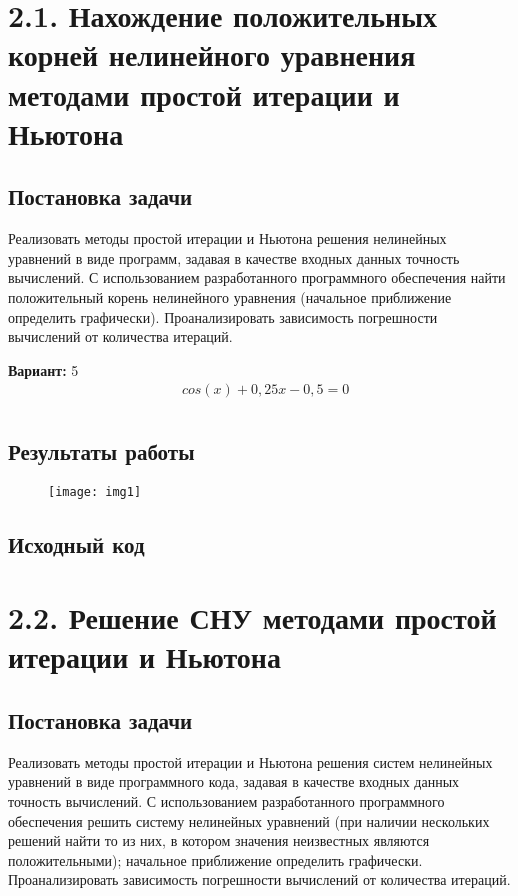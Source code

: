 \section* {2.1. Нахождение положительных корней нелинейного уравнения методами простой итерации и Ньютона}


\subsection{Постановка задачи}
Реализовать методы простой итерации и Ньютона решения нелинейных уравнений в виде программ, задавая в качестве входных данных точность вычислений. С использованием разработанного программного обеспечения найти положительный корень нелинейного уравнения (начальное приближение определить графически). Проанализировать зависимость погрешности вычислений от количества итераций. 

{\bfseries Вариант:} 5
\begin{align*}
& cos(x) + 0,25x - 0,5 = 0 \\
\end{align*}

\subsection{Результаты работы}
\begin{figure}[h!]
\raggedright
\texttt{[image: img1]}
\end{figure}
\pagebreak

\subsection{Исходный код}

\pagebreak

\section* {2.2. Решение СНУ методами простой итерации и Ньютона}

\setcounter{subsection}{0}


\subsection{Постановка задачи}
Реализовать методы простой итерации и Ньютона решения систем нелинейных уравнений в виде программного кода, задавая в качестве входных данных точность вычислений. С использованием разработанного программного обеспечения решить систему нелинейных уравнений (при наличии нескольких решений найти то из них, в котором значения неизвестных являются положительными); начальное приближение определить графически. Проанализировать зависимость погрешности вычислений от количества итераций.   

